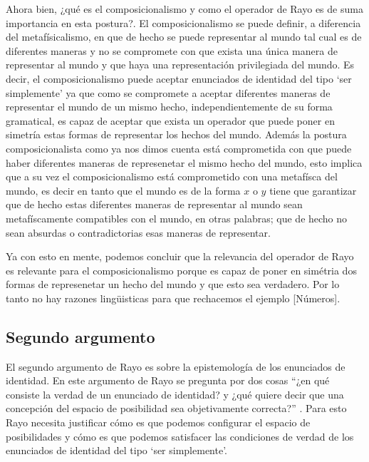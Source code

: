 \documentclass[]{article}
\begin{document}
Ahora bien, ¿qué es el composicionalismo y como el operador de Rayo
es de suma importancia en esta postura?. El composicionalismo 
se puede definir, a diferencia del metafísicalismo, en que de hecho se
puede representar al mundo tal cual es de diferentes maneras y no 
se compromete con que exista una única manera de representar al mundo 
y que haya una representación privilegiada del mundo. Es decir, 
el composicionalismo puede aceptar enunciados de identidad del tipo 
`ser simplemente' ya que como se compromete a aceptar diferentes 
maneras de representar el mundo de un mismo hecho, independientemente 
de su forma gramatical, es capaz de aceptar que exista un operador que 
puede poner en simetría estas formas de representar los hechos del 
mundo. Además la postura composicionalista como ya nos dimos 
cuenta est\'a comprometida con que puede haber diferentes maneras 
de represenetar el mismo hecho del mundo, esto implica que a su 
vez el composicionalismo est\'a comprometido con una metafísca del 
mundo, es decir en tanto que el mundo es de la forma $x$ o $y$ 
tiene que garantizar que de hecho estas diferentes maneras de 
representar al mundo sean metafíscamente compatibles con el 
mundo, en otras palabras; que de hecho no sean absurdas o 
contradictorias esas maneras de representar.

Ya con esto en mente, podemos concluir que la relevancia del 
operador de Rayo es relevante para el composicionalismo 
porque es capaz de poner en sim\'etria dos formas de represenetar 
un hecho del mundo y que esto sea verdadero. Por lo tanto 
no hay razones lingüisticas para que rechacemos el ejemplo [Números].

\subsection*{\small Segundo argumento}
El segundo argumento de Rayo es sobre la epistemología de 
los enunciados de identidad. En este argumento de Rayo 
se pregunta por dos cosas ``¿en qué consiste la verdad de un
enunciado de identidad? y ¿qué quiere decir que una concepción
del espacio de posibilidad sea objetivamente correcta?'' \cite{rayo2013}.
Para esto Rayo necesita justificar c\'omo es que podemos 
configurar el espacio de posibilidades y c\'omo es que 
podemos satisfacer las condiciones de verdad de los enunciados 
de identidad del tipo `ser simplemente'. 
\end{document}
